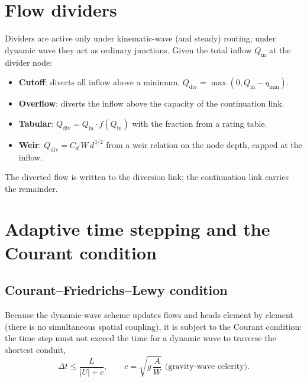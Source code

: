 \documentclass[11pt,a4paper]{article}
\begin{document}
\section{Flow dividers}

Dividers are active only under kinematic-wave (and steady) routing; under
dynamic wave they act as ordinary junctions. Given the total inflow
$Q_{\mathrm{in}}$ at the divider node:
\begin{itemize}[nosep]
  \item \textbf{Cutoff}: diverts all inflow above a minimum,
        $Q_{\mathrm{div}} = \max(0, Q_{\mathrm{in}} - q_{\min})$.
  \item \textbf{Overflow}: diverts the inflow above the capacity of the
        continuation link.
  \item \textbf{Tabular}: $Q_{\mathrm{div}} = Q_{\mathrm{in}}\cdot
        f(Q_{\mathrm{in}})$ with the fraction from a rating table.
  \item \textbf{Weir}: $Q_{\mathrm{div}} = C_d\,W\,d^{3/2}$ from a weir relation
        on the node depth, capped at the inflow.
\end{itemize}
The diverted flow is written to the diversion link; the continuation link
carries the remainder.

\section{Adaptive time stepping and the Courant condition}

\subsection{Courant--Friedrichs--Lewy condition}

Because the dynamic-wave scheme updates flows and heads element by element
(there is no simultaneous spatial coupling), it is subject to the Courant
condition: the time step must not exceed the time for a dynamic wave to
traverse the shortest conduit,
\begin{equation}
  \Delta t \le \frac{L}{\lvert U \rvert + c},
  \qquad c = \sqrt{g\,\frac{A}{W}}
  \text{ (gravity-wave celerity).}
\end{equation}
\end{document}
